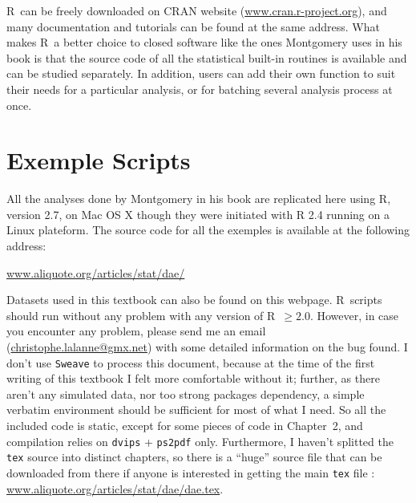 \documentclass[11pt,a4paper]{memoir}\usepackage[]{graphicx}\usepackage[]{color}
\newcommand{\R}{\textsf{R}}
\begin{document}
\R\ can be freely downloaded on CRAN website
(\href{http://www.cran.r-project.org}{www.cran.r-project.org}), and many
documentation and tutorials can be found at the same address. What makes \R\ a
better choice to closed software like the ones Montgomery uses in his book is
that the source code of all the statistical built-in routines is available and
can be studied separately. In addition, users can add their own function to
suit their needs for a particular analysis, or for batching several analysis
process at once.

\section*{Exemple Scripts}
\label{sec:exemple-scripts}
All the analyses done by Montgomery in his book are replicated here
using \R, version 2.7, on Mac OS X though they were initiated with R
2.4 running on a Linux plateform. The source code for all the exemples
is available at the following address:
\begin{center} \href{http://www.aliquote.org/articles/stat/dae/}%
{www.aliquote.org/articles/stat/dae/}
\end{center} 
Datasets used in this textbook can also be found on this webpage. \R\
scripts should run without any problem with any version of \R\
$\geq2.0$. However, in case you encounter any problem, please send me
an email
(\href{mailto:christophe.lalanne@gmx.net}{christophe.lalanne@gmx.net})
with some detailed information on the bug found. I don't use
\texttt{Sweave} to process this document, because at the time of the
first writing of this textbook I felt more comfortable without it;
further, as there aren't any simulated data, nor too strong
packages dependency, a simple verbatim environment should be
sufficient for most of what I need. So all the included code is
static, except for some pieces of code in Chapter~2, and compilation relies on
\texttt{dvips} + \texttt{ps2pdf} only. Furthermore, I haven't splitted
the \texttt{tex} source into distinct chapters, so there is a ``huge''
source file that can be downloaded from there if anyone is interested
in getting the main \texttt{tex} file :
\href{http://www.aliquote.org/articles/stat/dae/}%
{www.aliquote.org/articles/stat/dae/dae.tex}. 
\end{document}
